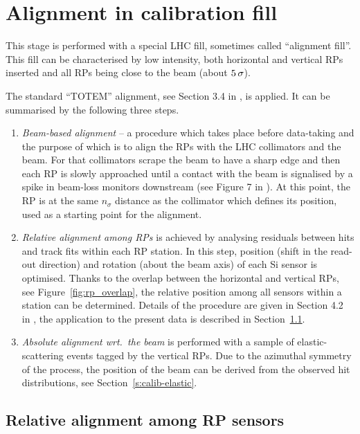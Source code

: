 \documentclass[TOTEM]{cern/cernphprep}
\def\un#1{\,{\rm #1}}
\begin{document}
\section{Alignment in calibration fill}
\label{s:calib}

This stage is performed with a special LHC fill, sometimes called ``alignment fill''. This fill can be characterised by low intensity, both horizontal and vertical RPs inserted and all RPs being close to the beam (about $5\un{\sigma}$).

The standard ``TOTEM'' alignment, see Section 3.4 in \cite{totem-ijmp}, is applied. It can be summarised by the following three steps.
\begin{enumerate}[nosep]
\item {\em Beam-based alignment} -- a procedure which takes place before data-taking and the purpose of which is to align the RPs with the LHC collimators and the beam. For that collimators scrape the beam to have a sharp edge and then each RP is slowly approached until a contact with the beam is signalised by a spike in beam-loss monitors downstream (see Figure 7 in \cite{totem-ijmp}). At this point, the RP is at the same $n_\sigma$ distance as the collimator which defines its position, used as a starting point for the alignment.
\item {\em Relative alignment among RPs} is achieved by analysing residuals between hits and track fits within each RP station. In this step, position (shift in the read-out direction) and rotation (about the beam axis) of each Si sensor is optimised. Thanks to the overlap between the horizontal and vertical RPs, see Figure~\ref{fig:rp_overlap}, the relative position among all sensors within a station can be determined. Details of the procedure are given in Section 4.2 in \cite{jan_thesis}, the application to the present data is described in Section~\ref{s:calib-track}.
\item {\em Absolute alignment wrt.~the beam} is performed with a sample of elastic-scattering events tagged by the vertical RPs. Due to the azimuthal symmetry of the process, the position of the beam can be derived from the observed hit distributions, see Section~\ref{s:calib-elastic}.
\end{enumerate}

\subsection{Relative alignment among RP sensors}
\label{s:calib-track}
\end{document}
